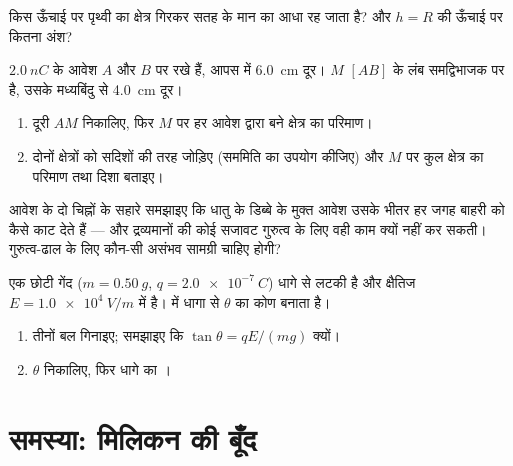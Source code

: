 \begin{exercise}[$\star\star\star$]\label{exo:g11:electric-gravitational-fields:12}
किस ऊँचाई पर पृथ्वी का क्षेत्र गिरकर सतह के मान का आधा रह जाता है?
और $h = R$ की ऊँचाई पर कितना अंश?
\end{exercise}

\begin{exercise}[$\star\star\star$]\label{exo:g11:electric-gravitational-fields:13}
$\qty{+2.0}{nC}$ के आवेश $A$ और $B$ पर रखे हैं, आपस में \qty{6.0}{cm} दूर।
$M$ $[AB]$ के लंब समद्विभाजक पर है, उसके मध्यबिंदु से \qty{4.0}{cm} दूर।
\begin{enumerate}
  \item दूरी $AM$ निकालिए, फिर $M$ पर हर आवेश द्वारा बने
        क्षेत्र का परिमाण।
  \item दोनों क्षेत्रों को सदिशों की तरह जोड़िए (सममिति का उपयोग
        कीजिए) और $M$ पर कुल क्षेत्र का परिमाण तथा दिशा बताइए।
\end{enumerate}
\end{exercise}

\begin{exercise}[$\star\star\star$]\label{exo:g11:electric-gravitational-fields:14}
आवेश के दो चिह्नों के सहारे समझाइए कि धातु के डिब्बे के मुक्त आवेश उसके भीतर
हर जगह बाहरी  को कैसे काट देते हैं --- और
द्रव्यमानों की कोई सजावट गुरुत्व के लिए वही काम क्यों नहीं कर सकती।
गुरुत्व-ढाल के लिए कौन-सी असंभव सामग्री चाहिए होगी?
\end{exercise}

\begin{exercise}[$\star\star\star$]\label{exo:g11:electric-gravitational-fields:15}
एक छोटी गेंद ($m = \qty{0.50}{g}$, $q = \qty{+2.0e-7}{C}$) धागे से लटकी है और क्षैतिज
 $E = \qty{1.0e4}{V/m}$ में है।  में धागा  से
$\theta$ का कोण बनाता है।
\begin{enumerate}
  \item तीनों बल गिनाइए; समझाइए कि $\tan\theta = qE / (mg)$ क्यों।
  \item $\theta$ निकालिए, फिर धागे का ।
\end{enumerate}
\end{exercise}

\section{समस्या: मिलिकन की बूँद}


